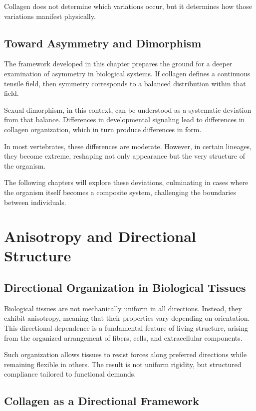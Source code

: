 \documentclass[11pt,oneside]{book}
\begin{document}
Collagen does not determine which variations occur, but it determines how those variations manifest physically.

\section{Toward Asymmetry and Dimorphism}

The framework developed in this chapter prepares the ground for a deeper examination of asymmetry in biological systems. If collagen defines a continuous tensile field, then symmetry corresponds to a balanced distribution within that field.

Sexual dimorphism, in this context, can be understood as a systematic deviation from that balance. Differences in developmental signaling lead to differences in collagen organization, which in turn produce differences in form.

In most vertebrates, these differences are moderate. However, in certain lineages, they become extreme, reshaping not only appearance but the very structure of the organism.

The following chapters will explore these deviations, culminating in cases where the organism itself becomes a composite system, challenging the boundaries between individuals.

\chapter{Anisotropy and Directional Structure}

\section{Directional Organization in Biological Tissues}

Biological tissues are not mechanically uniform in all directions. Instead, they exhibit anisotropy, meaning that their properties vary depending on orientation. This directional dependence is a fundamental feature of living structure, arising from the organized arrangement of fibers, cells, and extracellular components.

Such organization allows tissues to resist forces along preferred directions while remaining flexible in others. The result is not uniform rigidity, but structured compliance tailored to functional demands.

\section{Collagen as a Directional Framework}
\end{document}
